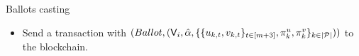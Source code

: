 \begin{boxfig}{\label{fig:private_vote}Ballots casting}{}
\begin{itemize}
\begin{itemize}
\begin{itemize}
			    \item pick randomness $r_{k,1},\ldots, r_{k,m+3}\leftarrow \ZZ_q$ and compute $u_{k,t}\leftarrow \Enc_{\pk}(e_t; r_{k,t})$, $t\in[m+3]$, where $e_t$ is a $t$-th bit of the vector $e^{(m+3)}_{k,l}$;
			    \item produce a proof $\pi_k^u$ showing that $\{u_{k,t}\}_{t\in[m+3]}$ encrypts a unit vector (see Fig.~\ref{fig:unit_zk_prover});
			    \item pick randomness $r_{k,\alpha}\leftarrow \ZZ_q$ and compute $\hat\alpha=\Enc_{\pk}(\alpha,r_{k,\alpha})$, where $\alpha$ is an amount of stake of a voter;
			    \item pick randomness $z_{k,1},\ldots, z_{k,m+3}\leftarrow \ZZ_q$ and compute $v_{k,t}\leftarrow \hat\alpha^{e_{t}} \cdot \Enc_{\pk}(0;z_{k,t})$, $t\in[m+3]$, where $e_{t}$ is a $t$-th bit of the vector $e^{(m+3)}_{k,l}$;
			    \item produce a proof $\pi_k^v$ showing that $\{v_{k,t}\}_{t\in[m+3]}$ is in correct relation to $\{u_{k,t}\}_{t\in[m+3]}$ and $\hat\alpha$ (see Fig.~\ref{fig:MultRelationNIZK});
			\end{itemize}
			  
			\item Send a transaction with $(Ballot, (\mathsf{V}_i, \hat\alpha,\{\{u_{k,t},v_{k,t}\}_{t\in[m+3]}, \pi_k^u, \pi_k^v\}_{k \in |\mathcal{P}|}))$ to the blockchain.
		\end{itemize}	
	\end{itemize}
\end{boxfig}

